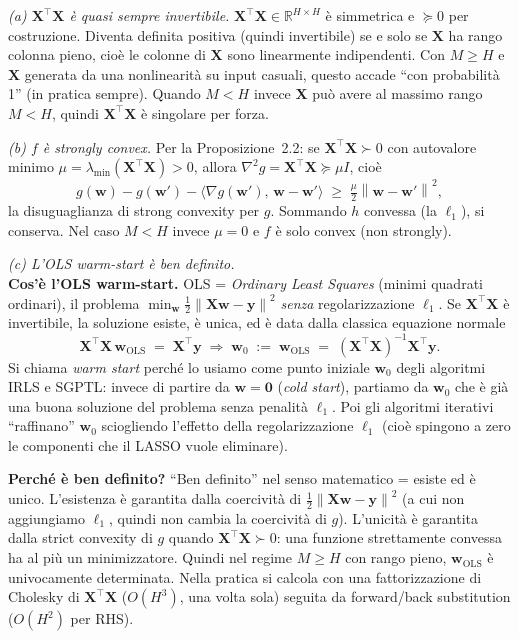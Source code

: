 \documentclass[11pt,a4paper]{article}
\newcommand{\R}{\mathbb{R}}
\newcommand{\norm}[1]{\left\|#1\right\|}
\newcommand{\inner}[2]{\langle #1,\,#2\rangle}
\newcommand{\bw}{\mathbf{w}}
\newcommand{\by}{\mathbf{y}}
\newcommand{\bX}{\mathbf{X}}
\newcommand{\bzero}{\mathbf{0}}
\theoremstyle{definition}
\begin{document}
\emph{(a) $\bX^\top\bX$ è quasi sempre invertibile.} $\bX^\top\bX\in\R^{H\times H}$ è simmetrica e $\succeq 0$ per costruzione. Diventa definita positiva (quindi invertibile) se e solo se $\bX$ ha rango colonna pieno, cioè le colonne di $\bX$ sono linearmente indipendenti. Con $M\ge H$ e $\bX$ generata da una nonlinearità su input casuali, questo accade ``con probabilità 1'' (in pratica sempre). Quando $M<H$ invece $\bX$ può avere al massimo rango $M<H$, quindi $\bX^\top\bX$ è singolare per forza.

\emph{(b) $f$ è strongly convex.} Per la Proposizione~2.2: se $\bX^\top\bX\succ 0$ con autovalore minimo $\mu = \lambda_{\min}(\bX^\top\bX)>0$, allora $\nabla^2 g = \bX^\top\bX\succeq\mu I$, cioè
\[
g(\bw) - g(\bw') - \inner{\nabla g(\bw')}{\bw-\bw'} \;\ge\; \tfrac{\mu}{2}\norm{\bw-\bw'}^2,
\]
la disuguaglianza di strong convexity per $g$. Sommando $h$ convessa (la $\ell_1$), si conserva. Nel caso $M<H$ invece $\mu=0$ e $f$ è solo convex (non strongly).

\emph{(c) L'OLS warm-start è ben definito.}\\
\textbf{Cos'è l'OLS warm-start.} OLS = \emph{Ordinary Least Squares} (minimi quadrati ordinari), il problema $\min_{\bw}\tfrac{1}{2}\norm{\bX\bw-\by}^2$ \emph{senza} regolarizzazione $\ell_1$. Se $\bX^\top\bX$ è invertibile, la soluzione esiste, è unica, ed è data dalla classica equazione normale
\[
\bX^\top\bX\,\bw_{\text{OLS}} \;=\; \bX^\top\by \;\Longrightarrow\; \bw_0 \;:=\; \bw_{\text{OLS}} \;=\; (\bX^\top\bX)^{-1}\bX^\top\by.
\]
Si chiama \emph{warm start} perché lo usiamo come punto iniziale $\bw_0$ degli algoritmi IRLS e SGPTL: invece di partire da $\bw=\bzero$ (\emph{cold start}), partiamo da $\bw_0$ che è già una buona soluzione del problema senza penalità $\ell_1$. Poi gli algoritmi iterativi ``raffinano'' $\bw_0$ sciogliendo l'effetto della regolarizzazione $\ell_1$ (cioè spingono a zero le componenti che il LASSO vuole eliminare).

\textbf{Perché è ben definito?} ``Ben definito'' nel senso matematico = esiste ed è unico. L'esistenza è garantita dalla coercività di $\tfrac{1}{2}\norm{\bX\bw-\by}^2$ (a cui non aggiungiamo $\ell_1$, quindi non cambia la coercività di $g$). L'unicità è garantita dalla strict convexity di $g$ quando $\bX^\top\bX\succ 0$: una funzione strettamente convessa ha al più un minimizzatore. Quindi nel regime $M\ge H$ con rango pieno, $\bw_{\text{OLS}}$ è univocamente determinata. Nella pratica si calcola con una fattorizzazione di Cholesky di $\bX^\top\bX$ ($O(H^3)$, una volta sola) seguita da forward/back substitution ($O(H^2)$ per RHS).
\end{document}
